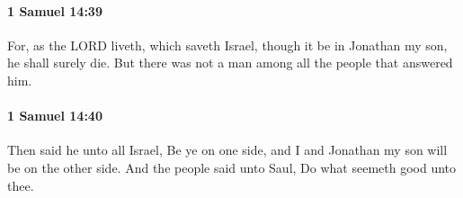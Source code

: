 		\paragraph{1 Samuel 14:39} %
			\label{1SAMUEL-14-39}

			For, as the LORD liveth, which saveth Israel, though it be in Jonathan my son, he shall surely die. But there was not a man among all the people that answered him.


		\paragraph{1 Samuel 14:40} %
			\label{1SAMUEL-14-40}

			Then said he unto all Israel, Be ye on one side, and I and Jonathan my son will be on the other side. And the people said unto Saul, Do what seemeth good unto thee.


